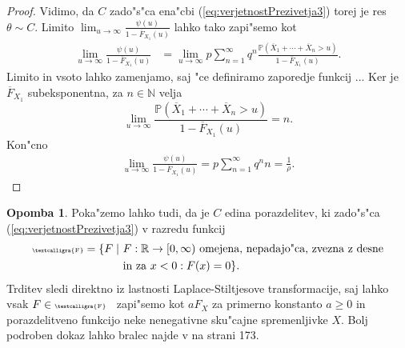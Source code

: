 \documentclass[12pt, a4paper, reqno]{amsart}
\theoremstyle{definition}
\newtheorem{opomba}[definicija]{Opomba}
\theoremstyle{plain}
\newcommand{\R}{\mathbb{R}}
\newcommand{\N}{\mathbb{N}}
\newcommand{\Prob}{\mathbb{P}}
\newcommand{\1}{\mathds{1}}
\begin{document}
\begin{proof}
            Vidimo, da $C$ zado"s"ca ena"cbi (\ref{eq:verjetnostPrezivetja3}) torej je res $\theta\sim C$. Limito 
            $\lim_{u\to\infty}\frac{\psi(u)}{1 - \overline{F}_{X_1}(u)}$ lahko tako zapi"semo kot
            \begin{align*}
                \lim_{u\to\infty}\frac{\psi(u)}{1 - \overline{F}_{X_1}(u)}   &= \lim_{u\to\infty}p\sum_{n=1}^{\infty}q^n\frac{\Prob\left(\overline{X}_1 + \cdots +\overline{X}_n > u\right)}{1 - \overline{F}_{X_1}(u)}.
            \end{align*}
            Limito in vsoto lahko zamenjamo, saj "ce definiramo zaporedje funkcij ...
            Ker je $\overline{F}_{X_1}$ subeksponentna, za $n\in\N$ velja
            \begin{equation*}
                \lim_{u\to\infty}\frac{\Prob\left(\overline{X}_1 + \cdots +\overline{X}_n > u\right)}{1 - \overline{F}_{X_1}(u)} = n.
            \end{equation*}
            Kon"cno 
            \begin{align*}
                \lim_{u\to\infty}\frac{\psi(u)}{1 - \overline{F}_{X_1}(u)} = p\sum_{n=1}^\infty q^nn = \frac{1}{\rho}.
            \end{align*}
        \end{proof}

        \begin{opomba}
            Poka"zemo lahko tudi, da je $C$ edina porazdelitev, ki zado"s"ca (\ref{eq:verjetnostPrezivetja3})
            v razredu funkcij 
            \begin{align*}
                \text{\tiny\textcalligra{F}} = \{F \mid \ & \text{$F:\R\to[0, \infty)$ omejena, nepadajo"ca, zvezna z desne} \\
                & \text{in za $x<0:F(x)=0$}\}.
            \end{align*}
            Trditev sledi direktno iz lastnosti Laplace-Stiltjesove transformacije, saj lahko vsak $F\in
            \text{\tiny\textcalligra{F}}$ \ zapi"semo kot $aF_X$ za primerno konstanto $a\geq0$ in porazdelitveno 
            funkcijo neke nenegativne sku"cajne spremenljivke $X$. Bolj podroben dokaz lahko bralec najde 
            v \cite{4} na strani 173.
            

                
            \label{op:tezkorepnePorazdelitveAsimptotika}
        \end{opomba}
\end{document}
